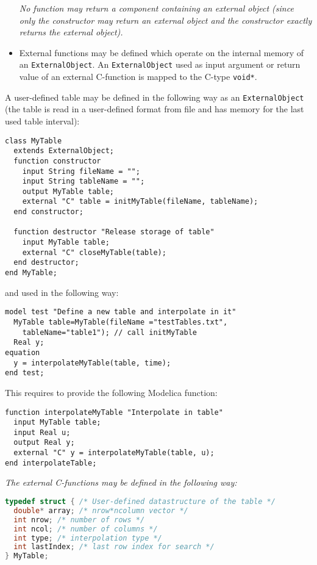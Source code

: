 \begin{itemize}
  \emph{No function may return a component containing an external object
  (since only the constructor may return an external object and the
  constructor exactly returns the external object).}
\item
  External functions may be defined which operate on the internal memory
  of an \lstinline!ExternalObject!. An \lstinline!ExternalObject! used as input argument or
  return value of an external C-function is mapped to the C-type
  \lstinline!void*!.
\end{itemize}

\begin{example}
A user-defined table may be defined in the following way as an \lstinline!ExternalObject!
(the table is read in a user-defined format from file and has memory for the last used table interval):
\begin{lstlisting}[language=modelica]
class MyTable
  extends ExternalObject;
  function constructor
    input String fileName = "";
    input String tableName = "";
    output MyTable table;
    external "C" table = initMyTable(fileName, tableName);
  end constructor;

  function destructor "Release storage of table"
    input MyTable table;
    external "C" closeMyTable(table);
  end destructor;
end MyTable;
\end{lstlisting}
and used in the following way:
\begin{lstlisting}[language=modelica]
model test "Define a new table and interpolate in it"
  MyTable table=MyTable(fileName ="testTables.txt",
    tableName="table1"); // call initMyTable
  Real y;
equation
  y = interpolateMyTable(table, time);
end test;
\end{lstlisting}

This requires to provide the following Modelica function:
\begin{lstlisting}[language=modelica]
function interpolateMyTable "Interpolate in table"
  input MyTable table;
  input Real u;
  output Real y;
  external "C" y = interpolateMyTable(table, u);
end interpolateTable;
\end{lstlisting}
\emph{The external C-functions may be defined in the following way:}
\begin{lstlisting}[language=C]
typedef struct { /* User-defined datastructure of the table */
  double* array; /* nrow*ncolumn vector */
  int nrow; /* number of rows */
  int ncol; /* number of columns */
  int type; /* interpolation type */
  int lastIndex; /* last row index for search */
} MyTable;


\end{lstlisting}
\end{example}
